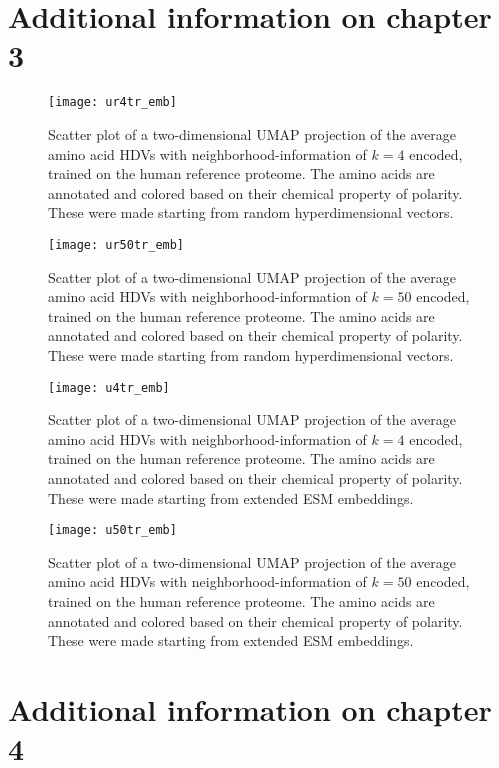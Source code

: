 \chapter{Additional information on chapter 3}\label{app:chp3}
\begin{figure}[H]
    \centering
    \texttt{[image: ur4tr\_emb]}
    \caption{Scatter plot of a two-dimensional UMAP projection of the average amino acid HDVs with neighborhood-information of $k = 4$ encoded, trained on the human reference proteome. The amino acids are annotated and colored based on their chemical property of polarity. These were made starting from random hyperdimensional vectors.}
    \label{fig:AAtr4ru}
\end{figure}
\begin{figure}[H]
    \centering
    \texttt{[image: ur50tr\_emb]}
    \caption{Scatter plot of a two-dimensional UMAP projection of the average amino acid HDVs with neighborhood-information of $k = 50$ encoded, trained on the human reference proteome. The amino acids are annotated and colored based on their chemical property of polarity. These were made starting from random hyperdimensional vectors.}
    \label{fig:AAtr50ru}
\end{figure}
\begin{figure}[H]
    \centering
    \texttt{[image: u4tr\_emb]}
    \caption{Scatter plot of a two-dimensional UMAP projection of the average amino acid HDVs with neighborhood-information of $k = 4$ encoded, trained on the human reference proteome. The amino acids are annotated and colored based on their chemical property of polarity. These were made starting from extended ESM embeddings.}
    \label{fig:AAtr4u}
\end{figure}
\begin{figure}[H]
    \centering
    \texttt{[image: u50tr\_emb]}
    \caption{Scatter plot of a two-dimensional UMAP projection of the average amino acid HDVs with neighborhood-information of $k = 50$ encoded, trained on the human reference proteome. The amino acids are annotated and colored based on their chemical property of polarity. These were made starting from extended ESM embeddings.}
    \label{fig:AAtr50u}
\end{figure}
\chapter{Additional information on chapter 4}\label{app:chp4}